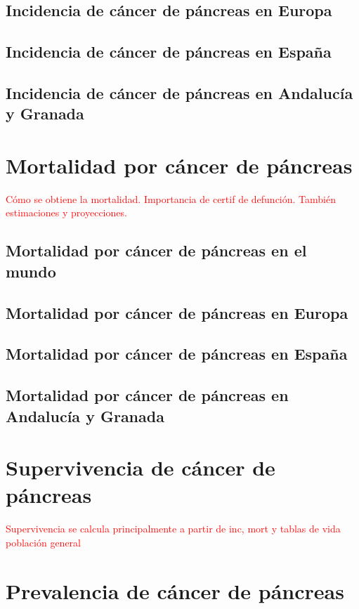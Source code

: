 \subsection{Incidencia de cáncer de páncreas en Europa}

\subsection{Incidencia de cáncer de páncreas en España}

\subsection{Incidencia de cáncer de páncreas en Andalucía y Granada}


\section{Mortalidad por cáncer de páncreas}

\textcolor{red}{Cómo se obtiene la mortalidad. Importancia de certif de defunción. También estimaciones y proyecciones.}

\subsection{Mortalidad por cáncer de páncreas en el mundo}

\subsection{Mortalidad por cáncer de páncreas en Europa}

\subsection{Mortalidad por cáncer de páncreas en España}

\subsection{Mortalidad por cáncer de páncreas en Andalucía y Granada}

\section{Supervivencia de cáncer de páncreas} 

\textcolor{red}{Supervivencia se calcula principalmente a partir de inc, mort y tablas de vida población general}

\section{Prevalencia de cáncer de páncreas}

